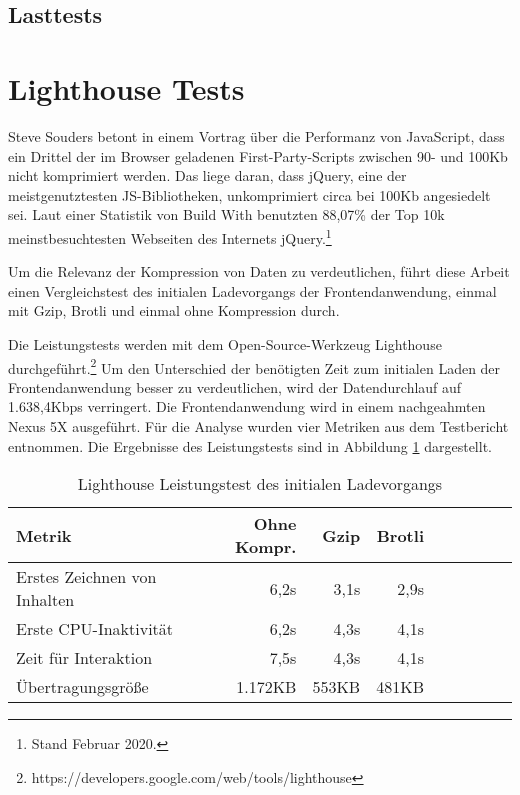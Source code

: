 \subsection{Lasttests}
\label{subsec:lasttests}





\section{Lighthouse Tests}
\label{sec:lighthousetests}

Steve Souders betont
in einem Vortrag über die Performanz von JavaScript, dass ein Drittel der im Browser
geladenen First-Party-Scripts zwischen 90- und 100Kb nicht komprimiert werden.
Das liege daran, dass jQuery, eine der meistgenutztesten JS-Bibliotheken,
unkomprimiert circa bei 100Kb angesiedelt sei.\cite{SteveSoudersMakeJavaScriptFaster}
Laut einer Statistik von Build With benutzten 88,07\% der Top 10k meinstbesuchtesten
Webseiten des Internets jQuery.\footnote{Stand Februar 2020.\cite{BuildWithjQuery}}

Um die Relevanz der Kompression von Daten zu verdeutlichen, führt diese Arbeit einen
Vergleichstest des initialen Ladevorgangs der Frontendanwendung,
einmal mit Gzip, Brotli und einmal ohne Kompression durch.

Die Leistungstests
werden mit dem Open-Source-Werkzeug Lighthouse durchgeführt.\footnote{https://developers.google.com/web/tools/lighthouse}
Um den Unterschied der benötigten Zeit zum initialen Laden der Frontendanwendung
besser zu verdeutlichen, wird der Datendurchlauf auf 1.638,4Kbps verringert.
Die Frontendanwendung wird in einem nachgeahmten Nexus 5X ausgeführt.
Für die Analyse wurden vier Metriken aus dem Testbericht entnommen.
Die Ergebnisse des Leistungstests sind in Abbildung \ref{tab:lighthouseleistungstestdesinitialenladevorgangs}
dargestellt.

\begin{table}[h]
\begin{center}
\begin{tabular}{l*{8}{r}}
Metrik & Ohne Kompr. & Gzip & Brotli \\
\hline
Erstes Zeichnen von Inhalten & 6,2s  & 3,1s & 2,9s \\
Erste CPU-Inaktivität        & 6,2s  & 4,3s & 4,1s \\
Zeit für Interaktion         & 7,5s  & 4,3s & 4,1s \\
Übertragungsgröße            & 1.172KB  &  553KB & 481KB \\
\end{tabular}
\end{center}
\caption{Lighthouse Leistungstest des initialen Ladevorgangs}
\label{tab:lighthouseleistungstestdesinitialenladevorgangs}
\end{table}

